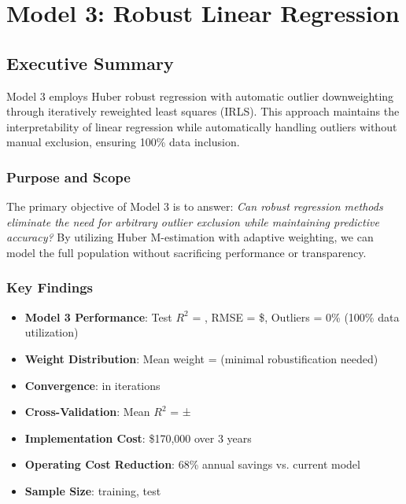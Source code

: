 
\chapter{Model 3: Robust Linear Regression}\label{ch:model3}




\def\themodel{3}

\section{Executive Summary}

Model 3 employs Huber robust regression with automatic outlier downweighting through iteratively reweighted least squares (IRLS). This approach maintains the interpretability of linear regression while automatically handling outliers without manual exclusion, ensuring 100\% data inclusion.

\subsection{Purpose and Scope}

The primary objective of Model 3 is to answer: \textit{Can robust regression methods eliminate the need for arbitrary outlier exclusion while maintaining predictive accuracy?} By utilizing Huber M-estimation with adaptive weighting, we can model the full population without sacrificing performance or transparency.

\subsection{Key Findings}

\begin{itemize}
    \item \textbf{Model 3 Performance}: Test $R^2$ = \ModelThreeRSquaredTest, RMSE = \$\ModelThreeRMSETest, Outliers = 0\% (100\% data utilization)
    \item \textbf{Weight Distribution}: Mean weight = \ModelThreeMeanWeight{} (minimal robustification needed)
    \item \textbf{Convergence}: \ModelThreeConverged{} in \ModelThreeNumIterations{} iterations
    \item \textbf{Cross-Validation}: Mean $R^2$ = \ModelThreeCVMean{} ± \ModelThreeCVStd
    \item \textbf{Implementation Cost}: \$170,000 over 3 years
    \item \textbf{Operating Cost Reduction}: 68\% annual savings vs. current model
    \item \textbf{Sample Size}: \ModelThreeTrainingSamples{} training, \ModelThreeTestSamples{} test
\end{itemize}

